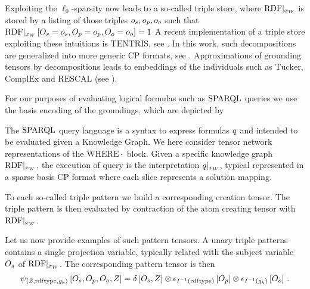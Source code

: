 Exploiting the $\ell_0$-sparsity now leads to a so-called triple store, where ${\mathrm{RDF}}|_{x_{W}}$ is stored by a listing of those triples $o_{s},o_{p},o_{o}$ such that ${\mathrm{RDF}}|_{x_{W}}\left[O_{s}=o_{s}, O_{p}=o_{p}, O_{o}=o_{o}\right]=1$
A recent implementation of a triple store exploiting these intuitions is $\mathrm{TENTRIS}$, see \cite{pan_tentris_2020}.
In this work, such decompositions are generalized into more generic CP formats, see .
Approximations of grounding tensors by decompositions leads to embeddings of the individuals such as $\mathrm{Tucker}$, $\mathrm{ComplEx}$ and $\mathrm{RESCAL}$ (see \cite{nickel_review_2016}).



For our purposes of evaluating logical formulas such as $\mathrm{SPARQL}$ queries we use the basis encoding of the groundings, which are depicted by
\begin{center}
    
\end{center}





The $\mathrm{SPARQL}$ query language is a syntax to express \firstOrderLogic{} formulas $q$ and intended to be evaluated given a Knowledge Graph.
We here consider tensor network representations of the $\mathrm{WHERE}{\cdot}$ block.
Given a specific knowledge graph ${\mathrm{RDF}}|_{x_{W}}$, the execution of query is the interpretation ${q}|_{x_{W}}$, typical represented in a sparse basis CP format where each slice represents a solution mapping.


To each so-called triple pattern we build a corresponding creation tensor. %
The triple pattern is then evaluated by contraction of the atom creating tensor with ${\mathrm{RDF}}|_{x_{W}}$.

Let us now provide examples of such pattern tensors.
A unary triple patterns contains a single projection variable, typically related with the subject variable $O_{s}$ of ${\mathrm{RDF}}|_{x_{W}}$.
The corresponding pattern tensor is then
\begin{align*}
    \psi_{\braket{Z,\mathrm{rdf}\mathrm{type},g_{k}}}\left[
        O_{s}, O_{p}, O_{o}, Z
    \right]
    = \delta\left[O_{s},Z\right]
    \otimes \epsilon_{I^{-1}(\mathrm{rdf}\mathrm{type})}\left[O_{p}\right]
    \otimes \epsilon_{I^{-1}(g_{k})}\left[O_{o}\right] \, .
\end{align*}

